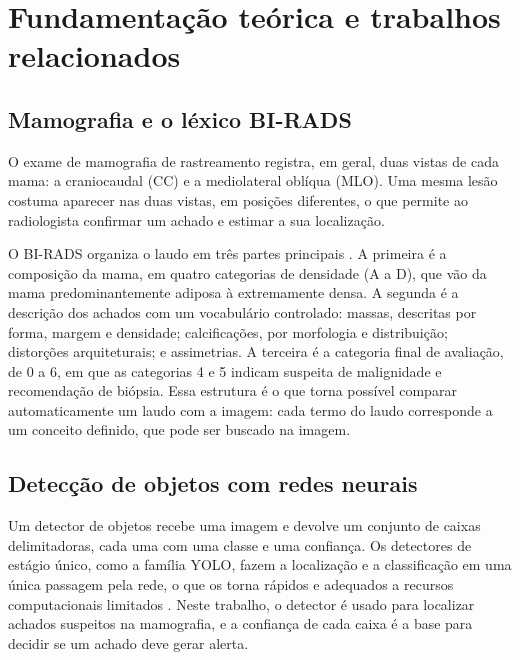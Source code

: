 \chapter{Fundamentação teórica e trabalhos relacionados}\label{cap:fundamentacao}

\section{Mamografia e o léxico BI-RADS}

O exame de mamografia de rastreamento registra, em geral, duas vistas de cada mama: a craniocaudal (CC) e a mediolateral oblíqua (MLO). Uma mesma lesão costuma aparecer nas duas vistas, em posições diferentes, o que permite ao radiologista confirmar um achado e estimar a sua localização.

O BI-RADS organiza o laudo em três partes principais \cite{dorsi2013birads}. A primeira é a composição da mama, em quatro categorias de densidade (A a D), que vão da mama predominantemente adiposa à extremamente densa. A segunda é a descrição dos achados com um vocabulário controlado: massas, descritas por forma, margem e densidade; calcificações, por morfologia e distribuição; distorções arquiteturais; e assimetrias. A terceira é a categoria final de avaliação, de 0 a 6, em que as categorias 4 e 5 indicam suspeita de malignidade e recomendação de biópsia. Essa estrutura é o que torna possível comparar automaticamente um laudo com a imagem: cada termo do laudo corresponde a um conceito definido, que pode ser buscado na imagem.

\section{Detecção de objetos com redes neurais}

Um detector de objetos recebe uma imagem e devolve um conjunto de caixas delimitadoras, cada uma com uma classe e uma confiança. Os detectores de estágio único, como a família YOLO, fazem a localização e a classificação em uma única passagem pela rede, o que os torna rápidos e adequados a recursos computacionais limitados \cite{jocher2023yolov8}. Neste trabalho, o detector é usado para localizar achados suspeitos na mamografia, e a confiança de cada caixa é a base para decidir se um achado deve gerar alerta.


